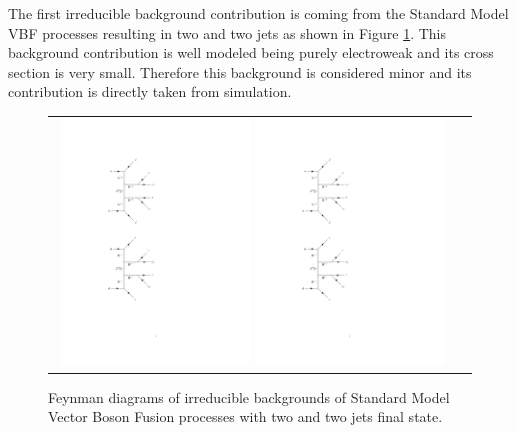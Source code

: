 The first irreducible background contribution is coming from the Standard Model VBF processes resulting in two \hadtau and two jets as shown in Figure \ref{fig:background_SMVBF}. This background contribution is well modeled being purely electroweak and its cross section is very small. Therefore this background is considered minor and its contribution is directly taken from simulation.

\begin{figure}[tbh!]
	\centering
	\begin{tabular}{cc}
		\includegraphics[width=0.48\textwidth]{diagrams/pics/background_SMVBFminus.pdf}
		\includegraphics[width=0.48\textwidth]{diagrams/pics/background_SMVBFplus.pdf} 		
	\end{tabular}
	\caption{Feynman diagrams of irreducible backgrounds of Standard Model Vector Boson Fusion processes with two \hadtau and two jets final state. }
	\label{fig:background_SMVBF}
\end{figure}

